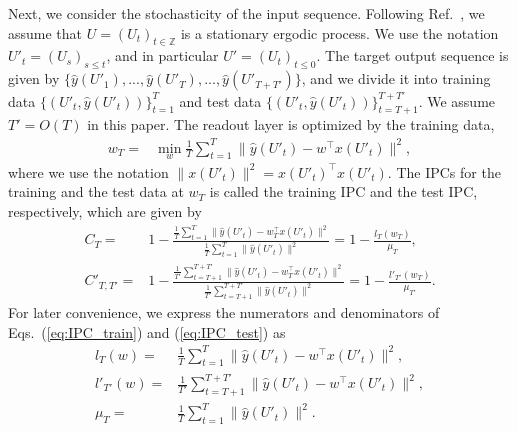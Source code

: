 \documentclass{article}
\begin{document}
Next, we consider the stochasticity of the input sequence. 
Following Ref.~\cite{dambre2012information, gonon2019reservoir}, we assume that $U = (U_t)_{t \in \mathbb{Z}}$ is a stationary ergodic process. 
We use the notation $U'_t = (U_s)_{s \leq t}$, and in particular $U' = (U_t)_{t \leq 0}$. 
The target output sequence is given by $\{\hat{y}(U'_1), ..., \hat{y}(U'_T), ..., \hat{y}(U'_{T+T'})\}$, and we divide it into training data $\{ (U'_t, \hat{y}(U'_t)) \}_{t=1}^T$ and test data $\{ (U'_t, \hat{y}(U'_t)) \}_{t=T+1}^{T+T'}$. 
We assume $T' = O(T)$ in this paper. 
The readout layer is optimized by the training data, 
\begin{align}
 w_T =& \min_w \frac{1}{T} \sum_{t=1}^T \|\hat{y}(U'_t) - w^\top x(U'_t)\|^2,
 \label{eq:w_MLE}
\end{align}
where we use the notation $\|x(U'_t)\|^2 = x(U'_t)^\top x(U'_t)$. 
The IPCs for the training and the test data at $w_T$ is called the training IPC and the test IPC, respectively, which are given by 
\begin{align} 
 C_T =& 1 - \frac{\frac{1}{T} \sum_{t=1}^T \|\hat{y}(U'_t) - w_T^\top x(U'_t)\|^2}{\frac{1}{T} \sum_{t=1}^T \|\hat{y}(U'_t)\|^2} 
  = 1 - \frac{l_T(w_T)}{\mu_T}, 
  \label{eq:IPC_train} \\ 
 C'_{T, T'} =& 1 - \frac{\frac{1}{T'} \sum_{t=T+1}^{T+T'} \|\hat{y}(U'_t) - w_T^\top x(U'_t)\|^2}{\frac{1}{T'} \sum_{t=T+1}^{T+T'} \|\hat{y}(U'_t)\|^2}
 = 1 - \frac{l'_{T'}(w_T)}{\mu_{T'}}. 
 \label{eq:IPC_test}
\end{align}
For later convenience, we express the numerators and denominators of Eqs.~(\ref{eq:IPC_train}) and (\ref{eq:IPC_test}) as 
\begin{align}
 l_T(w) =& \frac{1}{T} \sum_{t=1}^T \|\hat{y}(U'_t) - w^\top x(U'_t)\|^2,
 \label{eq:reservoir_norm_train} \\
 l'_{T'}(w) =& \frac{1}{T'} \sum_{t=T+1}^{T+T'} \|\hat{y}(U'_t) - w^\top x(U'_t)\|^2,
 \label{eq:reservoir_norm_test} \\
 \mu_T =& \frac{1}{T} \sum_{t=1}^T \|\hat{y}(U'_t)\|^2.
 \label{eq:teacher_norm}
\end{align}
\end{document}
